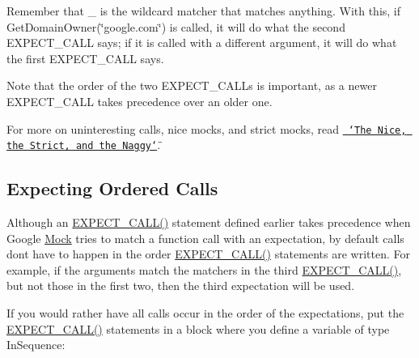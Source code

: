 Remember that {\ttfamily \+\_\+} is the wildcard matcher that matches anything. With this, if {\ttfamily Get\+Domain\+Owner(\char`\"{}google.\+com\char`\"{})} is called, it will do what the second {\ttfamily E\+X\+P\+E\+C\+T\+\_\+\+C\+A\+LL} says; if it is called with a different argument, it will do what the first {\ttfamily E\+X\+P\+E\+C\+T\+\_\+\+C\+A\+LL} says.

Note that the order of the two {\ttfamily E\+X\+P\+E\+C\+T\+\_\+\+C\+A\+L\+Ls} is important, as a newer {\ttfamily E\+X\+P\+E\+C\+T\+\_\+\+C\+A\+LL} takes precedence over an older one.

For more on uninteresting calls, nice mocks, and strict mocks, read \href{\#the-nice-the-strict-and-the-naggy}{\texttt{ \char`\"{}\+The Nice, the Strict, and the Naggy\char`\"{}}}.

\subsection*{Expecting Ordered Calls}

Although an {\ttfamily \mbox{\hyperlink{googletest-master_2googlemock_2include_2gmock_2gmock-spec-builders_8h_a535a6156de72c1a2e25a127e38ee5232}{E\+X\+P\+E\+C\+T\+\_\+\+C\+A\+L\+L()}}} statement defined earlier takes precedence when Google \mbox{\hyperlink{class_mock}{Mock}} tries to match a function call with an expectation, by default calls don\textquotesingle{}t have to happen in the order {\ttfamily \mbox{\hyperlink{googletest-master_2googlemock_2include_2gmock_2gmock-spec-builders_8h_a535a6156de72c1a2e25a127e38ee5232}{E\+X\+P\+E\+C\+T\+\_\+\+C\+A\+L\+L()}}} statements are written. For example, if the arguments match the matchers in the third {\ttfamily \mbox{\hyperlink{googletest-master_2googlemock_2include_2gmock_2gmock-spec-builders_8h_a535a6156de72c1a2e25a127e38ee5232}{E\+X\+P\+E\+C\+T\+\_\+\+C\+A\+L\+L()}}}, but not those in the first two, then the third expectation will be used.

If you would rather have all calls occur in the order of the expectations, put the {\ttfamily \mbox{\hyperlink{googletest-master_2googlemock_2include_2gmock_2gmock-spec-builders_8h_a535a6156de72c1a2e25a127e38ee5232}{E\+X\+P\+E\+C\+T\+\_\+\+C\+A\+L\+L()}}} statements in a block where you define a variable of type {\ttfamily In\+Sequence}\+:


\begin{DoxyCode}{0}
\DoxyCodeLine{}
\DoxyCodeLine{\{}
\DoxyCodeLine{}
\DoxyCodeLine{\}}
\end{DoxyCode}


